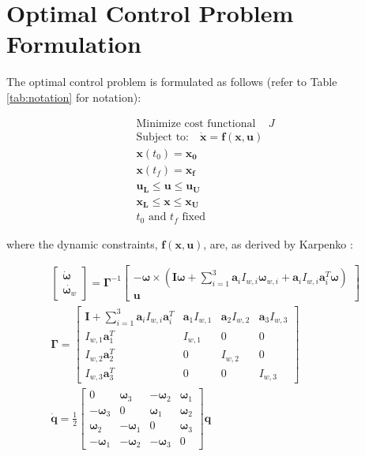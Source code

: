 \documentclass[letterpaper, paper,11pt]{AAS}		%
\begin{document}
\section{Optimal Control Problem Formulation}

The optimal control problem is formulated as follows (refer to Table \ref{tab:notation} for notation):

\begin{align*}
	\text{Minimize cost functional } \;\;\; J \\ 
	\text{Subject to}: \;\;\; \mathbf{\dot{x}} = \textbf{f}(\textbf{x},\textbf{u}) \\
	\mathbf{x}(t_{0}) = \mathbf{x_{0}}\\
	\mathbf{x}(t_{f}) = \mathbf{x_{f}}\\
	\mathbf{u_{L}} \leq \mathbf{u} \leq \mathbf{u_{U}} 	\\
	\mathbf{x_{L}} \leq \mathbf{x} \leq \mathbf{x_{U}} \\
	t_{0}\text{ and } t_{f} \text{ fixed}
\end{align*}

where the dynamic constraints, $\textbf{f}(\textbf{x},\textbf{u})$, are, as derived by Karpenko \cite{Karpenko2014}: 


\begin{align*}
\begin{bmatrix}
\dot{\pmb{\omega}}\\
\dot{\pmb{\omega}_{w}}
\end{bmatrix} = \pmb{\Gamma}^{-1} 
\begin{bmatrix}
-\pmb{\omega} \times ( \pmb{I\omega}+\sum_{i=1}^{3}\pmb{a}_{i}I_{w,i}\pmb{\omega}_{w,i} +\pmb{a}_{i}I_{w,i}\pmb{a}_{i}^{T}\pmb{\omega})\\
\pmb{u}
\end{bmatrix}\\
\pmb{\Gamma} = 
\begin{bmatrix}
\pmb{I}+\sum_{i=1}^{3}\pmb{a}_{i}I_{w,i}\pmb{a}_{i}^{T} & \pmb{a}_{1}I_{w,1} & \pmb{a}_{2}I_{w,2} & \pmb{a}_{3}I_{w,3}\\
I_{w,1}\pmb{a}_{1}^{T} & I_{w,1} & 0 & 0\\
I_{w,2}\pmb{a}_{2}^{T} & 0 & I_{w,2} & 0\\
I_{w,3}\pmb{a}_{3}^{T} & 0 & 0 & I_{w,3}
\end{bmatrix}\\
\dot{\pmb{q}} = \frac{1}{2}
\begin{bmatrix}
0 & \pmb{\omega}_{3} & -\pmb{\omega}_{2} & \pmb{\omega}_{1}\\
-\pmb{\omega}_{3} & 0 & \pmb{\omega}_{1} & \pmb{\omega}_{2} \\
\pmb{\omega}_{2} & -\pmb{\omega}_{1} & 0 & \pmb{\omega}_{3} \\
-\pmb{\omega}_{1} & -\pmb{\omega}_{2}& -\pmb{\omega}_{3} & 0 
\end{bmatrix} \pmb{q}
\end{align*}
\end{document}

